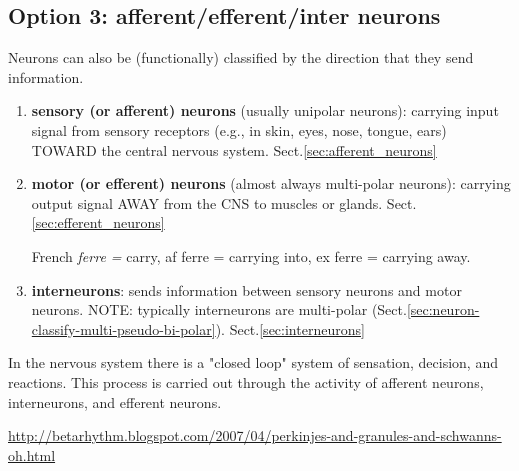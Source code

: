 \subsection{Option 3: afferent/efferent/inter neurons}
\label{sec:neuron-classify-afferent-efferent-inter}

Neurons can also be (functionally) classified by the direction that they send
information.
\begin{enumerate}
  
  \item {\bf sensory (or afferent) neurons} (usually unipolar neurons):
  carrying input signal from sensory receptors (e.g., in skin, eyes, nose,
  tongue, ears) TOWARD the central nervous system.
  Sect.\ref{sec:afferent_neurons}
  
  \item {\bf motor (or efferent) neurons} (almost always multi-polar neurons):
  carrying output signal AWAY from the CNS to muscles or glands.
  Sect.\ref{sec:efferent_neurons}
  
French {\it ferre =} carry, af ferre = carrying into, 
ex ferre = carrying away.
  
  \item {\bf interneurons}: sends information between sensory neurons and motor
  neurons. NOTE: typically interneurons are multi-polar
  (Sect.\ref{sec:neuron-classify-multi-pseudo-bi-polar}).
  Sect.\ref{sec:interneurons}
  
\end{enumerate}
In the nervous system there is a "closed loop" system of sensation, decision,
and reactions. This process is carried out through the activity of afferent
neurons, interneurons, and efferent neurons.

\url{http://betarhythm.blogspot.com/2007/04/perkinjes-and-granules-and-schwanns-oh.html}

